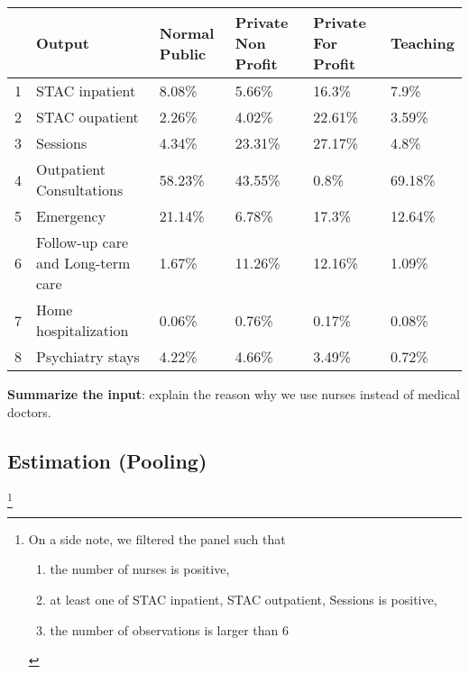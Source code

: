 \documentclass[12pt]{article}
\begin{document}
\begin{adjustbox}{width=1\textwidth}
    \begin{tabular}{rlllll}
        \toprule
          & Output                            & Normal Public & Private Non Profit & Private For Profit & Teaching \\
        \midrule
        1 & STAC inpatient                    & 8.08\%        & 5.66\%             & 16.3\%             & 7.9\%    \\
        2 & STAC oupatient                    & 2.26\%        & 4.02\%             & 22.61\%            & 3.59\%   \\
        3 & Sessions                          & 4.34\%        & 23.31\%            & 27.17\%            & 4.8\%    \\
        4 & Outpatient Consultations          & 58.23\%       & 43.55\%            & 0.8\%              & 69.18\%  \\
        5 & Emergency                         & 21.14\%       & 6.78\%             & 17.3\%             & 12.64\%  \\
        6 & Follow-up care and Long-term care & 1.67\%        & 11.26\%            & 12.16\%            & 1.09\%   \\
        7 & Home hospitalization              & 0.06\%        & 0.76\%             & 0.17\%             & 0.08\%   \\
        8 & Psychiatry stays                  & 4.22\%        & 4.66\%             & 3.49\%             & 0.72\%   \\
        \bottomrule
    \end{tabular}
\end{adjustbox}

\textbf{Summarize the input}: explain the reason why we use nurses instead of medical doctors.


\subsection{Estimation (Pooling)}

\footnote{On a side note, we filtered the panel such that
    \begin{enumerate}
        \item the number of nurses is positive,
        \item at least one of STAC inpatient, STAC outpatient, Sessions is positive,
        \item the number of observations is larger than 6
    \end{enumerate}}
\end{document}
